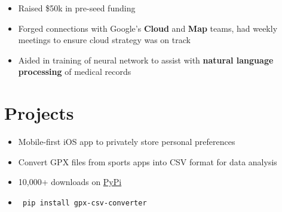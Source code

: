 \documentclass[]{deedy-template}
\begin{document}
\begin{minipage}[t]{0.66\textwidth}
\begin{itemize}[noitemsep,topsep=0pt]
    \item Raised \$50k in pre-seed funding

	\item Forged connections with Google’s \textbf{Cloud} and \textbf{Map} teams, had weekly
        \\meetings to ensure cloud strategy was on track

	\end{itemize}

	\sectionsep

	\begin{itemize}[noitemsep,topsep=0pt]
	\itemsep0em 

    \item Aided in training of neural network to assist with \textbf{natural language\\processing}
        of medical records

	\end{itemize}

	\sectionsep

\section{Projects}
	\begin{itemize}[noitemsep,topsep=0pt]
	\itemsep-0.2em 
    \item Mobile-first iOS app to privately store personal preferences
	\end{itemize}

	\sectionsep

	\begin{itemize}[noitemsep,topsep=0pt]
	\itemsep-0.2em 
	\item Convert GPX files from sports apps into CSV format for data analysis
	\item 10,000+ downloads on \href{https://pypi.org/project/gpx-csv-converter/}{PyPi}
    \item \begin{verbatim} pip install gpx-csv-converter \end{verbatim}
	\end{itemize}


\end{minipage}
\end{document}
